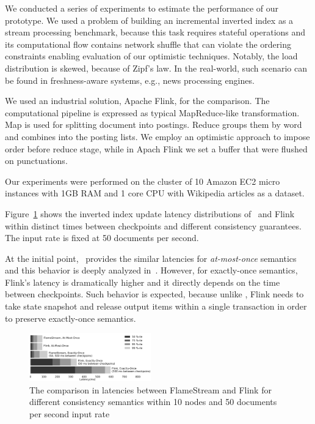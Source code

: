 \label {fs-short-experiments}

We conducted a series of experiments to estimate the performance of our prototype. We used a problem of building an incremental inverted index as a stream processing benchmark, because this task requires stateful operations and its computational flow contains network shuffle that can violate the ordering constraints enabling evaluation of our optimistic techniques. Notably, the load distribution is skewed, because of Zipf's law. In the real-world, such scenario can be found in freshness-aware systems, e.g., news processing engines.

We used an industrial solution, Apache Flink, for the comparison. The computational pipeline is expressed as typical MapReduce-like transformation. Map is used for splitting document into postings. Reduce groups them by word and combines into the posting lists. We employ an optimistic approach to impose order before reduce stage, while in Apach Flink we set a buffer that were flushed on punctuations.

Our experiments were performed on the cluster of 10 Amazon EC2 micro instances with 1GB RAM and 1 core CPU with Wikipedia articles as a dataset.

Figure~\ref{performance} shows the inverted index update latency distributions of \FlameStream\ and Flink within distinct times between checkpoints and different consistency guarantees. The input rate is fixed at 50 documents per second.

At the initial point, \FlameStream\ provides the similar latencies for {\em at-most-once} semantics and this behavior is deeply analyzed in~\cite{we2018seim}. However, for exactly-once semantics, Flink's latency is dramatically higher and it directly depends on the time between checkpoints. Such behavior is expected, because unlike \FlameStream, Flink needs to take state snapshot and release output items within a single transaction in order to preserve exactly-once semantics.

\begin{figure}[htbp]
  \centering
  \includegraphics[width=0.47\textwidth]{pics/comparison}
  \caption{The comparison in latencies between FlameStream and Flink for different consistency semantics within 10 nodes and 50 documents per second input rate}
  \label {performance}
\end{figure}
